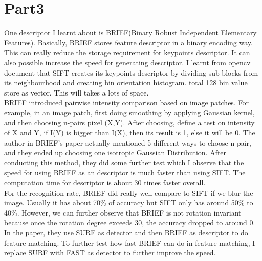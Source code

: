 \documentclass{article}
\begin{document}
\section*{Part3}
One descriptor I learnt about is BRIEF(Binary Robust Independent Elementary Features).
Basically, BRIEF stores feature descriptor in a binary encoding way. This can really reduce the storage requirement for keypoints descriptor.
It can also possible increase the speed for generating descriptor.
I learnt from opencv document that SIFT creates its keypoints descriptor by dividing sub-blocks from its neighbourhood and creating bin orientation histogram.
total 128 bin value store as vector. This will takes a lots of space. 
\\
BRIEF introduced pairwise intensity comparison based on image patches.
For example, in an image patch, first doing smoothing by applying Gaussian kernel, and then choosing n-pairs pixel (X,Y).
After choosing, define a test on intensity of X and Y, if I(Y) is bigger than I(X), then its result is 1, else it will be 0.
The author in BRIEF's paper actually mentioned 5 different ways to choose n-pair, and they ended up choosing one isotropic Gaussian Distribution.
After conducting this method, they did some further test which I observe that the speed for using BRIEF as an descriptor is much faster than using SIFT.
The computation time for descriptor is about 30 times faster overall.
\\
For the recognition rate, BRIEF did really well compare to SIFT if we blur the image. 
Usually it has about 70\% of accuracy but SIFT only has around 50\% to 40\%.
However, we can further observe that BRIEF is not rotation invariant because once the rotation degree exceeds 30, the accuracy dropped to around 0.
\\
In the paper, they use SURF as detector and then BRIEF as descriptor to do feature matching.
To further test how fast BRIEF can do in feature matching, I replace SURF with FAST as detector to further improve the speed.
\end{document}
